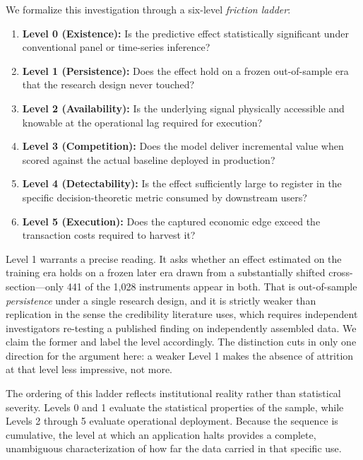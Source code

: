 \documentclass{ieeeaccess}
\begin{document}
We formalize this investigation through a six-level \textit{friction ladder}:
\begin{enumerate}
    \item \textbf{Level 0 (Existence):} Is the predictive effect statistically significant under conventional panel or time-series inference?
    \item \textbf{Level 1 (Persistence):} Does the effect hold on a frozen out-of-sample era that the research design never touched?
    \item \textbf{Level 2 (Availability):} Is the underlying signal physically accessible and knowable at the operational lag required for execution?
    \item \textbf{Level 3 (Competition):} Does the model deliver incremental value when scored against the actual baseline deployed in production?
    \item \textbf{Level 4 (Detectability):} Is the effect sufficiently large to register in the specific decision-theoretic metric consumed by downstream users?
    \item \textbf{Level 5 (Execution):} Does the captured economic edge exceed the transaction costs required to harvest it?
\end{enumerate}

Level 1 warrants a precise reading. It asks whether an effect estimated on the training era holds on a frozen later era drawn from a substantially shifted cross-section---only 441 of the 1,028 instruments appear in both. That is out-of-sample \textit{persistence} under a single research design, and it is strictly weaker than replication in the sense the credibility literature uses, which requires independent investigators re-testing a published finding on independently assembled data. We claim the former and label the level accordingly. The distinction cuts in only one direction for the argument here: a weaker Level 1 makes the absence of attrition at that level less impressive, not more.

The ordering of this ladder reflects institutional reality rather than statistical severity. Levels 0 and 1 evaluate the statistical properties of the sample, while Levels 2 through 5 evaluate operational deployment. Because the sequence is cumulative, the level at which an application halts provides a complete, unambiguous characterization of how far the data carried in that specific use.
\end{document}
